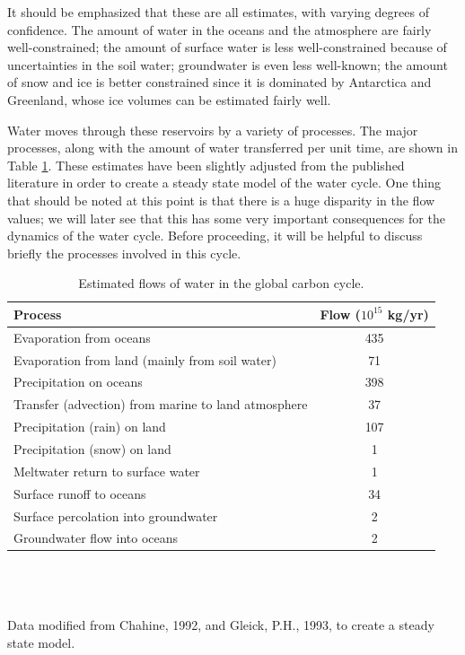 \documentclass[11pt,letterpaper]{article}
\begin{document}
It should be emphasized that these are all estimates, with varying degrees of confidence. The amount of water in the oceans and the atmosphere are fairly well-constrained; the amount of surface water is less well-constrained because of uncertainties in the soil water; groundwater is even less well-known; the amount of snow and ice is better constrained since it is dominated by Antarctica and Greenland, whose ice volumes can be estimated fairly well. 

Water moves through these reservoirs by a variety of processes. The major processes, along with the amount of water transferred per unit time, are shown in Table \ref{table:estimatedflows}. These estimates have been slightly adjusted from the published literature in order to create a steady state model of the water cycle. One thing that should be noted at this point is that there is a huge disparity in the flow values; we will later see that this has some very important consequences for the dynamics of the water cycle. Before proceeding, it will be helpful to discuss briefly the processes involved in this cycle.

\begin{table}[h]
\caption{Estimated flows of water in the global carbon cycle.\hspace{15cm}}
\begin{tabular}{lc}\\
\hline
Process & Flow ($10^{15}$ kg/yr)\\
\hline
Evaporation from oceans & 435 \\
Evaporation from land (mainly from soil water) & 71\\
Precipitation on oceans & 398\\
Transfer (advection) from marine to land atmosphere & 37 \\
Precipitation (rain) on land & 107\\
Precipitation (snow) on land & 1\\
Meltwater return to surface water & 1\\
Surface runoff to oceans & 34\\
Surface percolation into groundwater & 2\\
Groundwater flow into oceans & 2\\
\hline
\end{tabular}\\\\\\
Data modified from Chahine, 1992, and Gleick, P.H., 1993, to create a steady state model.
\label{table:estimatedflows}
\end{table}
\end{document}
